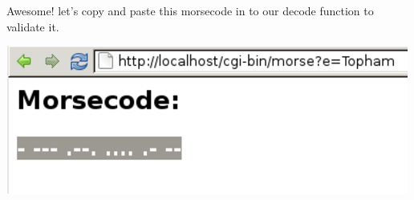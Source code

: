 Awesome! let's copy and paste this morsecode in to our decode function to validate it.

 
    \includegraphics{../test71.png}
     